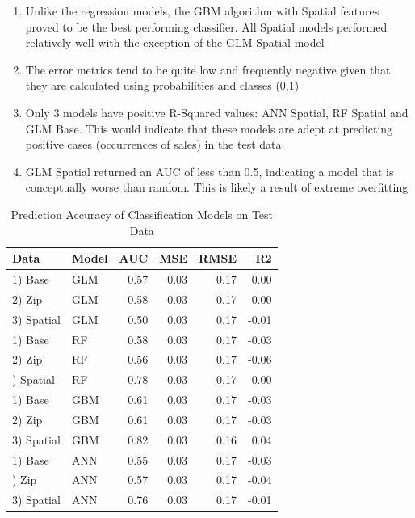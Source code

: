 \documentclass[12pt,]{article}
\providecommand{\tightlist}{%
  \setlength{\itemsep}{0pt}\setlength{\parskip}{0pt}}
\begin{document}
\begin{enumerate}
\def\labelenumi{\arabic{enumi})}
\tightlist
\item
  Unlike the regression models, the GBM algorithm with Spatial features
  proved to be the best performing classifier. All Spatial models
  performed relatively well with the exception of the GLM Spatial model
\item
  The error metrics tend to be quite low and frequently negative given
  that they are calculated using probabilities and classes (0,1)
\item
  Only 3 models have positive R-Squared values: ANN Spatial, RF Spatial
  and GLM Base. This would indicate that these models are adept at
  predicting positive cases (occurrences of sales) in the test data
\item
  GLM Spatial returned an AUC of less than 0.5, indicating a model that
  is conceptually worse than random. This is likely a result of extreme
  overfitting
\end{enumerate}

\begin{table}

\caption{\label{tab:Class Model Compare}\label{tab:ClassModelTable} Prediction Accuracy of Classification Models on Test Data}
\centering
\begin{tabular}[t]{llrrrr}
\toprule
Data & Model & AUC & MSE & RMSE & R2\\
\midrule
1) Base & GLM & 0.57 & 0.03 & 0.17 & 0.00\\
2) Zip & GLM & 0.58 & 0.03 & 0.17 & 0.00\\
3) Spatial & GLM & 0.50 & 0.03 & 0.17 & -0.01\\
1) Base & RF & 0.58 & 0.03 & 0.17 & -0.03\\
2) Zip & RF & 0.56 & 0.03 & 0.17 & -0.06\\
\addlinespace
3) Spatial & RF & 0.78 & 0.03 & 0.17 & 0.00\\
1) Base & GBM & 0.61 & 0.03 & 0.17 & -0.03\\
2) Zip & GBM & 0.61 & 0.03 & 0.17 & -0.03\\
3) Spatial & GBM & 0.82 & 0.03 & 0.16 & 0.04\\
1) Base & ANN & 0.55 & 0.03 & 0.17 & -0.03\\
\addlinespace
2) Zip & ANN & 0.57 & 0.03 & 0.17 & -0.04\\
3) Spatial & ANN & 0.76 & 0.03 & 0.17 & -0.01\\
\bottomrule
\end{tabular}
\end{table}
\end{document}
